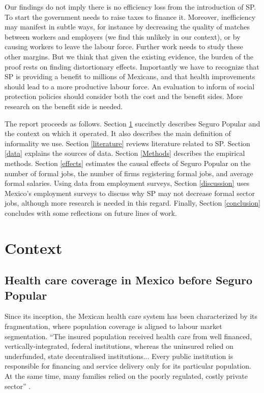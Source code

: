 \documentclass[oneside,11pt]{article}
\begin{document}
Our findings do not imply there is no efficiency loss from the introduction of SP.  To start the government needs to raise taxes to finance it.  Moreover, inefficiency may manifest in subtle ways, for instance by decreasing the quality of matches between workers and employers (we find this unlikely in our context), or by causing workers to leave the labour force. Further work needs to study these other margins. But we think that given the existing evidence, the burden of the proof rests on finding distortionary effects. Importantly we have to recognize that SP is providing a benefit to millions of Mexicans, and that health improvements should lead to a more productive labour force. An evaluation to inform of social protection policies should consider both the cost and the benefit sides. More research on the benefit side is needed. 

The report proceeds as follows. Section \ref{context} succinctly describes Seguro Popular and the context on which it operated. It also describes the main definition of informality we use. Section \ref{literature} reviews literature related to SP. Section \ref{data} explains the sources of data. Section \ref{Methods} describes the empirical methods. Section \ref{effects} estimates the causal effects of Seguro Popular on the number of formal jobs, the number of firms registering formal jobs, and average formal salaries. Using data from employment surveys, Section \ref{discussion} uses Mexico's employment surveys to discuss why SP may not decrease formal sector jobs, although more research is needed in this regard. Finally, Section \ref{conclusion} concludes with some reflections on future lines of work.



\section{Context} \label{context}


\subsection{Health care coverage in Mexico before Seguro Popular}
 
Since its inception, the Mexican health care system has been characterized by its fragmentation, where population coverage is aligned to labour market segmentation. ``The insured population received health care from well financed, vertically-integrated, federal institutions, whereas the uninsured relied on underfunded, state decentralised institutions... Every public institution is responsible for financing and service delivery only for its particular population. At the same time, many families relied on the poorly regulated, costly private sector'' \citep{Lancet}. 
\end{document}

